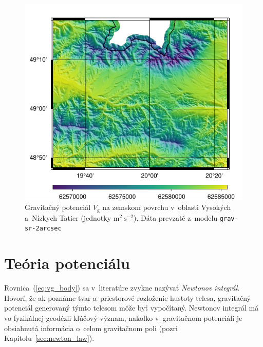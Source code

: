 \documentclass[a4paper, 12pt]{book}
\newcommand{\gidx}{\mathrm g}
\begin{document}
\begin{figure}
\centering
\includegraphics{./fig-vg-grav-sr-2arcsec.pdf}
\caption{Gravitačný potenciál $V_\gidx$ na zemskom povrchu v~oblasti Vysokých
a~Nízkych Tatier (jednotky $\mathrm{m}^2 \ \mathrm{s}^{-2}$).  Dáta prevzaté
z~modelu \texttt{grav-sr-2arcsec} \citep{GravSR2arcsec}}
\label{fig:vg_grav_sr_2arcsec}
\end{figure}






\section{Teória potenciálu}
\label{sec:potential_theory}

Rovnica~(\ref{eq:vg_body}) sa v~literatúre zvykne nazývať \emph{Newtonov
integrál}.  Hovorí, že ak poznáme tvar a~priestorové rozloženie hustoty telesa,
gravitačný potenciál generovaný týmto telesom môže byť vypočítaný.  Newtonov
integrál má vo fyzikálnej geodézii kľúčový význam, nakoľko v~gravitačnom
potenciáli je obsiahnutá informácia o~celom gravitačnom poli (pozri
Kapitolu~\ref{sec:newton_law}).
\end{document}
